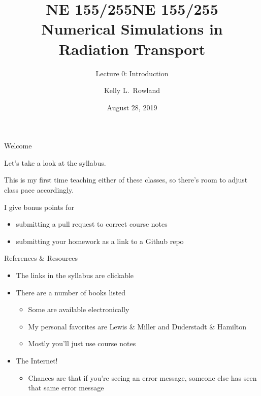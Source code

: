 \documentclass[xcolor=x11names]{beamer}
\title{NE 155/255}
\author{Kelly L.\ Rowland}
\date{August 28, 2019}
\begin{document}
\begin{frame}
\title{NE 155/255\\Numerical Simulations in Radiation Transport}
\subtitle{Lecture 0: Introduction}
\titlepage
\end{frame}

\begin{frame}{Welcome}

Let's take a look at the syllabus.

\vfill
\pause

This is my first time teaching either of these classes, so there's room to
adjust class pace accordingly.


\vfill
\pause

I give bonus points for
  \begin{itemize}
  \item submitting a pull request to correct course notes
  \item submitting your homework as a link to a Github repo
  \end{itemize}

\end{frame}

\begin{frame}{References \& Resources}

\begin{itemize}
\item The links in the syllabus are clickable
\item There are a number of books listed
  \begin{itemize}
  \item Some are available electronically
  \item My personal favorites are Lewis \& Miller and Duderstadt \& Hamilton
  \item Mostly you'll just use course notes
  \end{itemize}
\item The Internet!
  \begin{itemize}
  \item Chances are that if you're seeing an error message, someone else has
        seen that same error message
  \end{itemize}
\end{itemize}

\end{frame}
\end{document}
